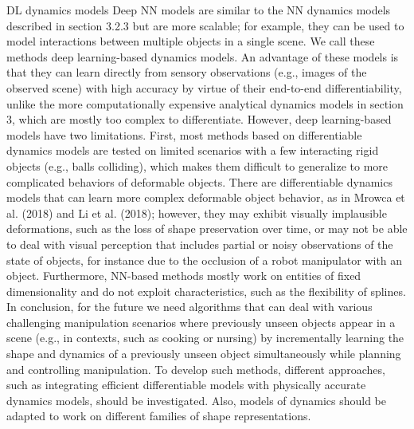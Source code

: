 \documentclass[\home/main.tex]{subfiles}
\begin{document}
        DL dynamics models 
        Deep NN models are similar to      the NN dynamics models described in section 3.2.3 but are more
        scalable; for example, they can be used to model interactions
        between multiple objects in a single scene. We call these
        methods deep learning-based dynamics models. An advantage
        of these models is that they can learn directly from sensory
        observations (e.g., images of the observed scene) with high
        accuracy by virtue of their end-to-end differentiability, unlike
        the more computationally expensive analytical dynamics models
        in section 3, which are mostly too complex to differentiate.
        However, deep learning-based models have two limitations. First,
        most methods based on differentiable dynamics models are tested
        on limited scenarios with a few interacting rigid objects (e.g.,
        balls colliding), which makes them difficult to generalize to
        more complicated behaviors of deformable objects. There are
        differentiable dynamics models that can learn more complex
        deformable object behavior, as in Mrowca et al. (2018) and Li
        et al. (2018); however, they may exhibit visually implausible
        deformations, such as the loss of shape preservation over time,
        or may not be able to deal with visual perception that includes
        partial or noisy observations of the state of objects, for instance
        due to the occlusion of a robot manipulator with an object.
        Furthermore, NN-based methods mostly work on entities of fixed
        dimensionality and do not exploit characteristics, such as the
        flexibility of splines.
        In conclusion, for the future we need algorithms that
        can deal with various challenging manipulation scenarios
        where previously unseen objects appear in a scene (e.g.,
        in contexts, such as cooking or nursing) by incrementally
        learning the shape and dynamics of a previously unseen object
        simultaneously while planning and controlling manipulation.
        To develop such methods, different approaches, such as
        integrating efficient differentiable models with physically
        accurate dynamics models, should be investigated. Also, models
        of dynamics should be adapted to work on different families of
        shape representations.
\end{document}
